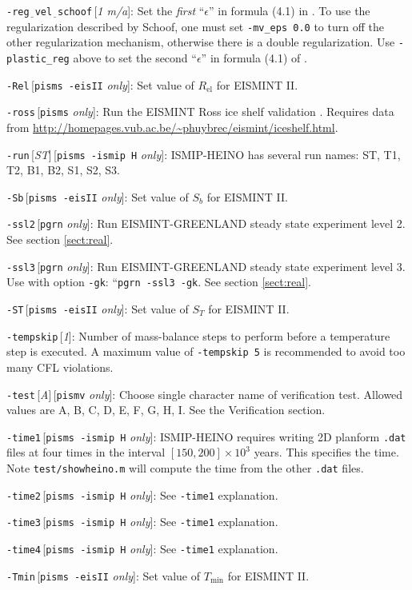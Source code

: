 \documentclass[11pt,final]{amsart}
\newcommand{\eps}{\epsilon}
\newcommand{\rawopt}[1]{\vspace{1mm}\noindent \Large\texttt{-#1}\normalsize}
\newcommand{\optdef}[2]{\rawopt{#1}\,[\textsl{#2}]:\quad}
\newcommand{\optrestrict}[2]{\rawopt{#1}\,[\texttt{#2} \textsl{only}]:\quad}
\newcommand{\optdefrestrict}[3]{\rawopt{#1}\,[\textsl{#2}]\,[\texttt{#3} \textsl{only}]:\quad}
\newcommand{\und}{$\underline{\,\,\,}$}
\begin{document}
\optdef{reg\und vel\und schoof}{1 m/a}  Set the \emph{first} ``$\eps$'' in formula (4.1) in \cite{SchoofStream}.  To use the regularization described by Schoof, one must set \verb|-mv_eps 0.0| to turn off the other regularization mechanism, otherwise there is a double regularization.  Use \verb|-plastic_reg| above to set the second ``$\eps$'' in formula (4.1) of \cite{SchoofStream}.

\optrestrict{Rel}{pisms -eisII}    Set value of $R_{\text{el}}$ for EISMINT II.

\optrestrict{ross}{pisms}    Run the EISMINT Ross ice shelf validation \cite{MacAyealetal}.  Requires data from \url{http://homepages.vub.ac.be/~phuybrec/eismint/iceshelf.html}.

\optdefrestrict{run}{ST}{pisms -ismip H}  ISMIP-HEINO has several run names: ST, T1, T2, B1, B2, S1, S2, S3.

\optrestrict{Sb}{pisms -eisII}    Set value of $S_b$ for EISMINT II.

\optrestrict{ssl2}{pgrn}    Run EISMINT-GREENLAND steady state experiment level 2. See section \ref{sect:real}.

\optrestrict{ssl3}{pgrn}    Run EISMINT-GREENLAND steady state experiment level 3.  Use with option \verb|-gk|: ``\verb|pgrn -ssl3 -gk|.  See section \ref{sect:real}.

\optrestrict{ST}{pisms -eisII}    Set value of $S_T$ for EISMINT II.

\optdef{tempskip}{1}  Number of mass-balance steps to perform before a temperature step is executed.  A maximum value of \verb|-tempskip 5| is recommended to avoid too many CFL violations.

\optdefrestrict{test}{A}{pismv}  Choose single character name of verification test.  Allowed values are A, B, C, D, E, F, G, H, I.  See the Verification section.

\optrestrict{time1}{pisms -ismip H}  ISMIP-HEINO requires writing 2D planform \verb|.dat| files at four times in the interval $[150,200]\times 10^{3}$ years.  This specifies the time.  Note \verb|test/showheino.m| will compute the time from the other \verb|.dat| files.

\optrestrict{time2}{pisms -ismip H}  See \verb|-time1| explanation.

\optrestrict{time3}{pisms -ismip H}  See \verb|-time1| explanation.

\optrestrict{time4}{pisms -ismip H}  See \verb|-time1| explanation.

\optrestrict{Tmin}{pisms -eisII}    Set value of $T_{\text{min}}$ for EISMINT II.
\end{document}
